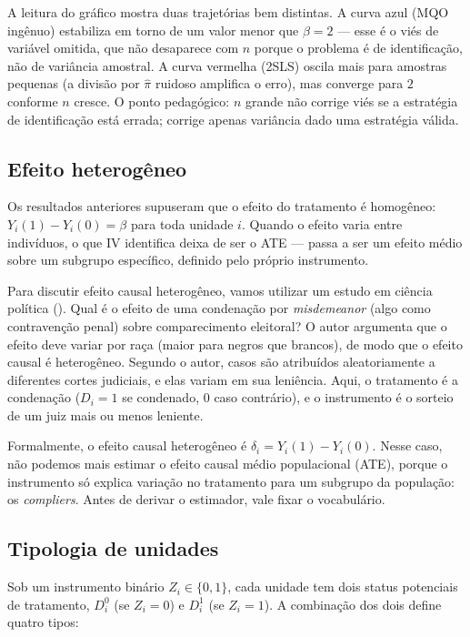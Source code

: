 \documentclass[
]{article}
\begin{document}
A leitura do gráfico mostra duas trajetórias bem distintas. A curva azul (MQO ingênuo) estabiliza em torno de um valor menor que \(\beta = 2\) --- esse é o viés de variável omitida, que não desaparece com \(n\) porque o problema é de identificação, não de variância amostral. A curva vermelha (2SLS) oscila mais para amostras pequenas (a divisão por \(\hat\pi\) ruidoso amplifica o erro), mas converge para \(2\) conforme \(n\) cresce. O ponto pedagógico: \(n\) grande não corrige viés se a estratégia de identificação está errada; corrige apenas variância dado uma estratégia válida.

\subsection{Efeito heterogêneo}\label{efeito-heteroguxeaneo}

Os resultados anteriores supuseram que o efeito do tratamento é homogêneo: \(Y_i(1) - Y_i(0) = \beta\) para toda unidade \(i\). Quando o efeito varia entre indivíduos, o que IV identifica deixa de ser o ATE --- passa a ser um efeito médio sobre um subgrupo específico, definido pelo próprio instrumento.

Para discutir efeito causal heterogêneo, vamos utilizar um estudo em ciência política (). Qual é o efeito de uma condenação por \emph{misdemeanor} (algo como contravenção penal) sobre comparecimento eleitoral? O autor argumenta que o efeito deve variar por raça (maior para negros que brancos), de modo que o efeito causal é heterogêneo. Segundo o autor, casos são atribuídos aleatoriamente a diferentes cortes judiciais, e elas variam em sua leniência. Aqui, o tratamento é a condenação (\(D_i = 1\) se condenado, \(0\) caso contrário), e o instrumento é o sorteio de um juiz mais ou menos leniente.

Formalmente, o efeito causal heterogêneo é \(\delta_i = Y_i(1) - Y_i(0)\). Nesse caso, não podemos mais estimar o efeito causal médio populacional (ATE), porque o instrumento só explica variação no tratamento para um subgrupo da população: os \emph{compliers}. Antes de derivar o estimador, vale fixar o vocabulário.

\subsection{Tipologia de unidades}\label{tipologia-de-unidades}

Sob um instrumento binário \(Z_i \in \{0, 1\}\), cada unidade tem dois status potenciais de tratamento, \(D^0_i\) (se \(Z_i = 0\)) e \(D^1_i\) (se \(Z_i = 1\)). A combinação dos dois define quatro tipos:
\end{document}
